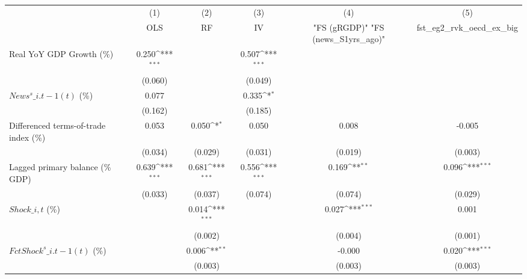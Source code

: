 {
\def\sym#1{\ifmmode^{#1}\else\(^{#1}\)\fi}
\begin{tabular}{l*{5}{c}}
\toprule
                    &\multicolumn{1}{c}{(1)}&\multicolumn{1}{c}{(2)}&\multicolumn{1}{c}{(3)}&\multicolumn{1}{c}{(4)}&\multicolumn{1}{c}{(5)}\\
                    &\multicolumn{1}{c}{OLS}&\multicolumn{1}{c}{RF}&\multicolumn{1}{c}{IV}&\multicolumn{1}{c}{ "FS (gRGDP)"  "FS (news\_S1yrs\_ago)" }&\multicolumn{1}{c}{fst\_eg2\_rvk\_oecd\_ex\_big}\\
\midrule
Real YoY GDP Growth (\%)&       0.250\sym{***}&                     &       0.507\sym{***}&                     &                     \\
                    &     (0.060)         &                     &     (0.049)         &                     &                     \\
\addlinespace
$ News^s\_{i.t-1}(t)$ (\%)&       0.077         &                     &       0.335\sym{*}  &                     &                     \\
                    &     (0.162)         &                     &     (0.185)         &                     &                     \\
\addlinespace
Differenced terms-of-trade index (\%)&       0.053         &       0.050\sym{*}  &       0.050         &       0.008         &      -0.005         \\
                    &     (0.034)         &     (0.029)         &     (0.031)         &     (0.019)         &     (0.003)         \\
\addlinespace
Lagged primary balance (\% GDP)&       0.639\sym{***}&       0.681\sym{***}&       0.556\sym{***}&       0.169\sym{**} &       0.096\sym{***}\\
                    &     (0.033)         &     (0.037)         &     (0.074)         &     (0.074)         &     (0.029)         \\
\addlinespace
$ Shock\_{i,t}$ (\%) &                     &       0.014\sym{***}&                     &       0.027\sym{***}&       0.001         \\
                    &                     &     (0.002)         &                     &     (0.004)         &     (0.001)         \\
\addlinespace
$ FctShock^s\_{i.t-1}(t)$ (\%)&                     &       0.006\sym{**} &                     &      -0.000         &       0.020\sym{***}\\
                    &                     &     (0.003)         &                     &     (0.003)         &     (0.003)         \\

\end{tabular}}
